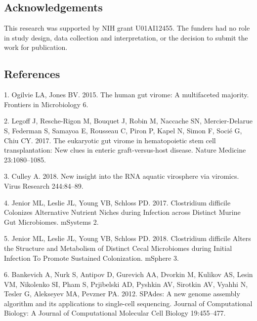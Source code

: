 \documentclass[11pt,]{article}
\begin{document}
\hypertarget{acknowledgements}{%
\subsection{Acknowledgements}\label{acknowledgements}}

This research was supported by NIH grant U01AI12455. The funders had no
role in study design, data collection and interpretation, or the
decision to submit the work for publication.

\newpage

\hypertarget{references}{%
\subsection{References}\label{references}}

\hypertarget{refs}{}
\leavevmode\hypertarget{ref-ogilvie_human_2015}{}%
1. Ogilvie LA, Jones BV. 2015. The human gut virome: A multifaceted
majority. Frontiers in Microbiology 6.

\leavevmode\hypertarget{ref-legoff_eukaryotic_2017}{}%
2. Legoff J, Resche-Rigon M, Bouquet J, Robin M, Naccache SN,
Mercier-Delarue S, Federman S, Samayoa E, Rousseau C, Piron P, Kapel N,
Simon F, Socié G, Chiu CY. 2017. The eukaryotic gut virome in
hematopoietic stem cell transplantation: New clues in enteric
graft-versus-host disease. Nature Medicine 23:1080--1085.

\leavevmode\hypertarget{ref-culley_new_2018}{}%
3. Culley A. 2018. New insight into the RNA aquatic virosphere via
viromics. Virus Research 244:84--89.

\leavevmode\hypertarget{ref-jenior_clostridium_2017}{}%
4. Jenior ML, Leslie JL, Young VB, Schloss PD. 2017. Clostridium
difficile Colonizes Alternative Nutrient Niches during Infection across
Distinct Murine Gut Microbiomes. mSystems 2.

\leavevmode\hypertarget{ref-jenior_clostridium_2018}{}%
5. Jenior ML, Leslie JL, Young VB, Schloss PD. 2018. Clostridium
difficile Alters the Structure and Metabolism of Distinct Cecal
Microbiomes during Initial Infection To Promote Sustained Colonization.
mSphere 3.

\leavevmode\hypertarget{ref-bankevich_spades:_2012}{}%
6. Bankevich A, Nurk S, Antipov D, Gurevich AA, Dvorkin M, Kulikov AS,
Lesin VM, Nikolenko SI, Pham S, Prjibelski AD, Pyshkin AV, Sirotkin AV,
Vyahhi N, Tesler G, Alekseyev MA, Pevzner PA. 2012. SPAdes: A new genome
assembly algorithm and its applications to single-cell sequencing.
Journal of Computational Biology: A Journal of Computational Molecular
Cell Biology 19:455--477.
\end{document}
